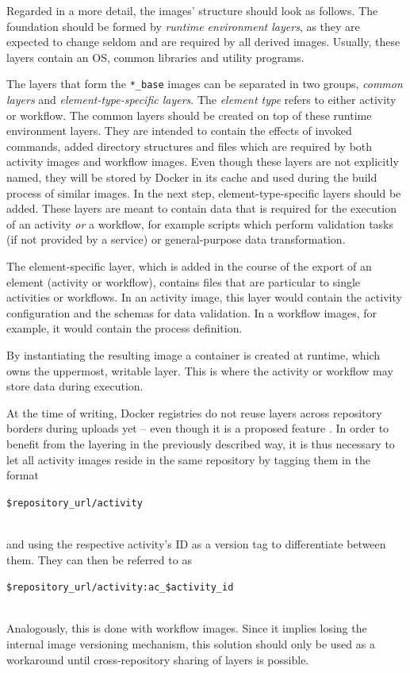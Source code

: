   Regarded in a more detail, the images' structure should look as follows.
  The foundation should be formed by \emph{runtime environment layers}, as they are expected to change  seldom and are required by all derived images. Usually, these layers contain an \ac{OS}, common libraries and utility programs.

  The layers that form the \texttt{*\_base} images can be separated in two groups, \emph{common layers} and \emph{element-type-specific layers}. The \emph{element type} refers to either activity or workflow.
  The common layers should be created on top of these runtime environment layers. They are intended to contain the effects of invoked commands, added directory structures and files which are required by both activity images and workflow images. Even though these layers are not explicitly named, they will be stored by Docker in its cache and used during the build process of similar images.
  In the next step, element-type-specific layers should be added. These layers are meant to contain data that is required for the execution of an activity \emph{or} a workflow, for example scripts which perform validation tasks (if not provided by a service) or general-purpose data transformation.

  The element-specific layer, which is added in the course of the export of an element (activity or workflow), contains files that are particular to single activities or workflows. In an activity image, this layer would contain the activity configuration and the schemas for data validation. In a workflow images, for example, it would contain the process definition.

  By instantiating the resulting image a container is created at runtime, which owns the uppermost, writable layer. This is where the activity or workflow may store data during execution.

  At the time of writing, Docker registries do not reuse layers across repository borders during uploads yet -- even though it is a proposed feature \cite{Mcgowan2015Proposal}. In order to benefit from the layering in the previously described way, it is thus necessary to let all activity images reside in the same repository by tagging them in the format
  \\ [0.5ex]
  \centerline{\texttt{\$repository\_url/activity}}
  \\ [0.5ex]
  and using the respective activity's \ac{ID} as a version tag to differentiate between them. They can then be referred to as
  \\ [0.5ex]
  \centerline{\texttt{\$repository\_url/activity:ac\_\$activity\_id}}
  \\ [0.5ex]
  Analogously, this is done with workflow images. Since it implies losing the internal image versioning mechanism, this solution should only be used as a workaround until cross-repository sharing of layers is possible.

